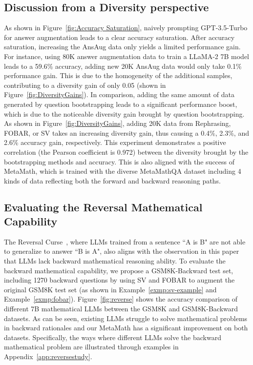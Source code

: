     \subsection{Discussion from a Diversity perspective}
    \vspace{-1.5mm}
    As shown in Figure~\ref{fig:Accuracy Saturation}, naively prompting GPT-3.5-Turbo for answer augmentation leads to a clear accuracy saturation. After accuracy saturation, increasing the AnsAug data only yields a limited performance gain. For instance, using 80K answer augmentation data to train a LLaMA-2 7B model leads to a 59.6\% accuracy, adding new 20K AnsAug data would only take 0.1\% performance gain. This is due to the homogeneity of the additional samples, contributing to a diversity gain of only 0.05 (shown in Figure~\ref{fig:DiversityGains}). In comparison, adding the same amount of data generated by question bootstrapping leads to a significant performance boost, which is due to the noticeable diversity gain brought by question bootstrapping. As shown in Figure~\ref{fig:DiversityGains}, adding 20K data from Rephrasing, FOBAR, or SV takes an increasing diversity gain, thus causing a 0.4\%, 2.3\%, and 2.6\% accuracy gain, respectively. This experiment demonstrates a positive correlation (the Pearson coefficient is 0.972) between the diversity brought by the bootstrapping methods and accuracy. This is also aligned with the success of MetaMath, which is trained with the diverse MetaMathQA dataset including 4 kinds of data reflecting both the forward and backward reasoning paths.

\vspace{-2.00mm}
\subsection{Evaluating the Reversal Mathematical Capability}
 \vspace{-1.5mm}
The Reversal Curse~\citep{berglund2023reversal}, where LLMs trained from a sentence ``A is B" are not able to generalize to answer ``B is A", also aligns with the observation in this paper that LLMs lack backward mathematical reasoning ability. To evaluate the backward mathematical capability, we propose a GSM8K-Backward test set, including 1270 backward questions by using SV and FOBAR to augment the original GSM8K test set (as shown in Example~\ref{exmp:sv-example} and Example~\ref{exmp:fobar}). 
Figure~\ref{fig:reverse} shows the accuracy comparison of different 7B mathematical LLMs between the GSM8K and GSM8K-Backward datasets. As can be seen, existing LLMs struggle to solve mathematical problems in backward rationales and our MetaMath has a significant improvement on both datasets. Specifically, the ways where different LLMs solve the backward mathematical problem are illustrated through examples in Appendix~\ref{app:reversestudy}.

